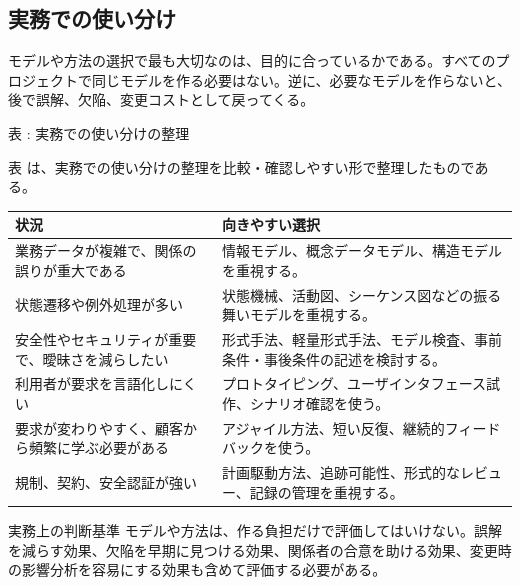 \subsection{実務での使い分け}
モデルや方法の選択で最も大切なのは、目的に合っているかである。すべてのプロジェクトで同じモデルを作る必要はない。逆に、必要なモデルを作らないと、後で誤解、欠陥、変更コストとして戻ってくる。

\par\smallskip\noindent{}\label{tab:ch11-09}表 \thetable: 実務での使い分けの整理\par\smallskip
表 \thetable は、実務での使い分けの整理を比較・確認しやすい形で整理したものである。\par\smallskip
\begin{longtable}{>{\raggedright\arraybackslash}p{}>{\raggedright\arraybackslash}p{}}
\toprule
状況 & 向きやすい選択 \\
\midrule
業務データが複雑で、関係の誤りが重大である & 情報モデル、概念データモデル、構造モデルを重視する。\\
状態遷移や例外処理が多い & 状態機械、活動図、シーケンス図などの振る舞いモデルを重視する。\\
安全性やセキュリティが重要で、曖昧さを減らしたい & 形式手法、軽量形式手法、モデル検査、事前条件・事後条件の記述を検討する。\\
利用者が要求を言語化しにくい & プロトタイピング、ユーザインタフェース試作、シナリオ確認を使う。\\
要求が変わりやすく、顧客から頻繁に学ぶ必要がある & アジャイル方法、短い反復、継続的フィードバックを使う。\\
規制、契約、安全認証が強い & 計画駆動方法、追跡可能性、形式的なレビュー、記録の管理を重視する。\\
\bottomrule
\end{longtable}

\begin{pointbox}{実務上の判断基準}
モデルや方法は、作る負担だけで評価してはいけない。誤解を減らす効果、欠陥を早期に見つける効果、関係者の合意を助ける効果、変更時の影響分析を容易にする効果も含めて評価する必要がある。
\end{pointbox}
